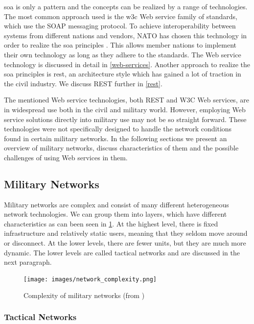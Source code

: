 \gls{soa} is only a pattern and the concepts can be realized by a range of
technologies. The most common approach used is the \gls{w3c} Web service family
of standards, which use the SOAP messaging protocol. To achieve interoperability
between systems from different nations and vendors, NATO has chosen this
technology in order to realize the \gls{soa} principles \cite{soa-baseline}. This
allows member nations to implement their own technology as long as they adhere
to the standards. The Web service technology is discussed in detail in
\cref{web-services}. Another approach to realize the \gls{soa} principles is
\gls{rest}, an architecture style which has gained a lot of traction in the
civil industry. We discuss REST further in \cref{rest}.

The mentioned Web service technologies, both REST and W3C Web services, are in
widespread use both in the civil and military world. However, employing Web
service solutions directly into military use may not be so straight forward.
These technologies were not specifically designed to handle the network
conditions found in certain military networks. In the following sections we
present an overview of military networks, discuss characteristics of them and
the possible challenges of using Web services in them.

\subsection{Military Networks}

Military networks are complex and consist of many different heterogeneous
network technologies. We can group them into layers, which have different
characteristics as can been seen in \cref{figure:military-networks}. At the
highest level, there is fixed infrastructure and relatively static users,
meaning that they seldom move around or disconnect. At the lower levels, there
are fewer units, but they are much more dynamic. The lower levels are called
tactical networks and are discussed in the next paragraph.

\begin{figure}[h]
\texttt{[image: images/network\_complexity.png]}
\caption{Complexity of military networks (from \cite{pervasive-web})}
\label{figure:military-networks}
\end{figure}

\subsubsection{Tactical Networks}

